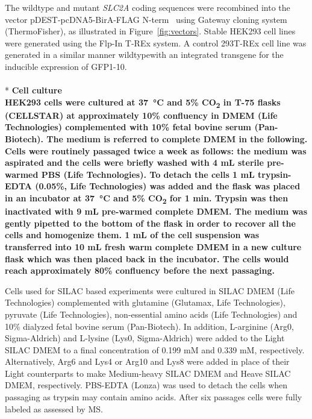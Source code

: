 The wildtype and mutant \textit{SLC2A} coding sequences were recombined into the vector pDEST-pcDNA5-BirA-FLAG N-term~\cite{Couzens} using Gateway cloning system (ThermoFisher), as illustrated in Figure~\ref{fig:vectors}. Stable HEK293 cell lines were generated using the Flp-In T-REx system. A control 293T-REx cell line was generated in a similar manner wildtypewith an integrated transgene for the inducible expression of GFP1-10.
\\
\\*
\bfseries{Cell culture}\\
\normalfont HEK293 cells were cultured at \SI{37}{\celsius} and 5\% CO\textsubscript{2} in T-75 flasks (CELLSTAR) at approximately 10\% confluency in DMEM (Life Technologies) complemented with 10\% fetal bovine serum (Pan-Biotech). The medium is referred to complete DMEM in the following. Cells were routinely passaged twice a week as follows: the medium was aspirated and the cells were briefly washed with 4 mL sterile pre-warmed PBS (Life Technologies). To detach the cells 1 mL trypsin-EDTA (0.05\%, Life Technologies) was added and the flask was placed in an incubator at \SI{37}{\celsius} and 5\% CO\textsubscript{2} for 1 min. Trypsin was then inactivated with 9 mL pre-warmed complete DMEM. The medium was gently pipetted to the bottom of the flask in order to recover all the cells and homogenize them. 1 mL of the cell suspension was transferred into 10 mL fresh warm complete DMEM in a new culture flask which was then placed back in the incubator. The cells would reach approximately 80\% confluency before the next passaging.

Cells used for SILAC based experiments were cultured in SILAC DMEM (Life Technologies) complemented with glutamine (Glutamax, Life Technologies), pyruvate (Life Technologies), non-essential amino acids (Life Technologies) and 10\% dialyzed fetal bovine serum (Pan-Biotech). In addition, L-arginine (Arg0, Sigma-Aldrich) and L-lysine (Lys0, Sigma-Aldrich) were added to the Light SILAC DMEM to a final concentration of 0.199 mM and 0.339 mM, respectively. Alternatively, Arg6 and Lys4 or Arg10 and Lys8 were added in place of their Light counterparts to make Medium-heavy SILAC DMEM and Heave SILAC DMEM, respectively. PBS-EDTA (Lonza) was used to detach the cells when passaging as trypsin may contain amino acids. After six passages cells were fully labeled as assessed by MS.

